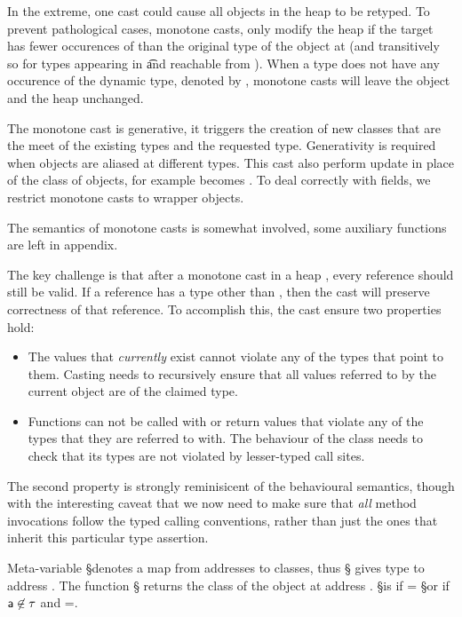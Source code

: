 \documentclass[a4paper,USenglish]{tex/lipics-v2016}
\begin{document}
In the extreme, one cast could cause all objects in the heap to be
retyped. To prevent pathological cases, monotone casts, only modify the heap
if the target \C has fewer occurences of \any than the original type of the
object at \a (and transitively so for types appearing in \t and reachable
from \a).  When a type \C does not have any occurence of the dynamic type,
denoted by \statictype\C\K\V, monotone casts will leave the object and the
heap unchanged.

The monotone cast is generative, it triggers the creation of new classes
that are the meet of the existing types and the requested type. Generativity
is required when objects are aliased at different types.  This cast also
perform update in place of the class of objects, for example \obj\C{\a}
becomes \obj\D{\a}. To deal correctly with fields, we restrict monotone
casts to wrapper objects.

The semantics of monotone casts is somewhat involved, some auxiliary
functions are left in appendix.



The key challenge is that after a monotone
cast in a heap \s, every reference should still be valid.  If a reference
has a type other than \any, then the cast will preserve correctness of that
reference. To accomplish this, the cast ensure two properties hold:
\begin{itemize}
\item The values that \emph{currently} exist cannot violate any of the types
  that point to them. Casting needs to recursively ensure that all values
  referred to by the current object are of the claimed type.
\item Functions can not be called with or return values that violate any of
  the types that they are referred to with. The behaviour of the class needs
  to check that its types are not violated by lesser-typed call sites.
\end{itemize}
The second property is strongly reminisicent of the behavioural semantics,
though with the interesting caveat that we now need to make sure that
\emph{all} method invocations follow the typed calling conventions, rather
than just the ones that inherit this particular type assertion.


Meta-variable \S denotes a map from addresses to classes, thus
\Map\S{\Bind\a\C} gives type \C to address \a. The function \htype\a\S\s
returns the class of the object at address \a.  \htype\a\S\s is \C if \C =
\App\S\a or if ${\sf{a}}\not\in\tau$ and \obj\C{\b\a}=\App\s\a.
\end{document}
